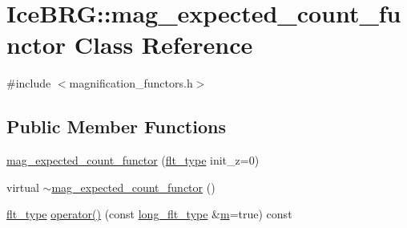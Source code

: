 \hypertarget{classIceBRG_1_1mag__expected__count__functor}{\section{Ice\-B\-R\-G\-:\-:mag\-\_\-expected\-\_\-count\-\_\-functor Class Reference}
\label{classIceBRG_1_1mag__expected__count__functor}
}


{\ttfamily \#include $<$magnification\-\_\-functors.\-h$>$}

\subsection*{Public Member Functions}
\begin{DoxyCompactItemize}
\item 
\hyperlink{classIceBRG_1_1mag__expected__count__functor_ae8cfd011211991dd4d66d3aa26b228e2}{mag\-\_\-expected\-\_\-count\-\_\-functor} (\hyperlink{lib_2IceBRG__main_2common_8h_ad0f130a56eeb944d9ef2692ee881ecc4}{flt\-\_\-type} init\-\_\-z=0)
\item 
virtual \hyperlink{classIceBRG_1_1mag__expected__count__functor_ad371e59c7eccf99936b1464eab520234}{$\sim$mag\-\_\-expected\-\_\-count\-\_\-functor} ()
\item 
\hyperlink{lib_2IceBRG__main_2common_8h_ad0f130a56eeb944d9ef2692ee881ecc4}{flt\-\_\-type} \hyperlink{classIceBRG_1_1mag__expected__count__functor_a1634698c687459cc3476fac2f548384d}{operator()} (const \hyperlink{lib_2IceBRG__main_2common_8h_a7040956e7e1b504d34a9ccfb4253bdce}{long\-\_\-flt\-\_\-type} \&\hyperlink{namespaceIceBRG_ada6365c5d16106f0608afbd34f010bcc}{m}=true) const 
\end{DoxyCompactItemize}


